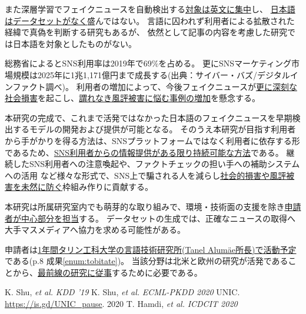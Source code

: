 また深層学習でフェイクニュースを自動検出する\underline{対象は英文に集中}し、
\underline{日本語はデータセットがなく}盛んではない。
言語に囚われず利用者による拡散された経緯で真偽を判断する研究もあるが\cite{tarek2020}、
依然として記事の内容を考慮した研究では日本語を対象としたものがない。

総務省によるとSNS利用率は2019年で69\%を占める。
更にSNSマーケティング市場規模は2025年に1兆1,171億円まで成長する(出典：サイバー・バズ/デジタルインファクト調べ)。
利用者の増加によって、今後フェイクニュースが\underline{更に深刻な社会損害}を起こし、\underline{謂れなき風評被害に悩む事例の増加}を懸念する。

本研究の完成で、これまで活発ではなかった日本語のフェイクニュースを早期検出するモデルの開発および提供が可能となる。
そのうえ本研究が目指す利用者から手がかりを得る方法は、SNSプラットフォームではなく利用者に依存する形であるため、\underline{SNS利用者からの情報提供がある限り持続可能な方法}である。
継続したSNS利用者への注意喚起や、ファクトチェックの担い手への補助システムへの活用
など様々な形式で、SNS上で騙される人を減らし\underline{社会的損害や風評被害を未然に防ぐ}枠組み作りに貢献する。



本研究は所属研究室内でも萌芽的な取り組みで、環境・技術面の支援を除き\underline{申請者が中心部分を担当}する。
データセットの生成では、正確なニュースの取得へ大手マスメディアへ協力を求める可能性がある。

申請者は\underline{1年間タリン工科大学の言語技術研究所(Tanel Alumäe所長)で活動予定}である(p.8 成果\ref{enum:tobitate})。
当該分野は北米と欧州の研究が活発であることから、\underline{最前線の研究に従事}するために必要である。

{\footnotesize 
\begin{twobibliography}{99}
    \setlength{\parskip}{0cm}
    \setlength{\itemsep}{0cm}
    \setcounter{enumiv}{9}
     K. Shu, \textit{et al.} \textit{KDD '19}
     K. Shu, \textit{et al.} \textit{ECML-PKDD 2020}
     UNIC. \url{https://is.gd/UNIC_pause}. 2020
     T. Hamdi, \textit{et al.} \textit{ICDCIT 2020}
\end{twobibliography}
}


